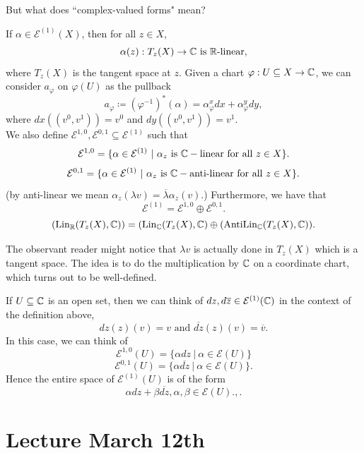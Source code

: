 \documentclass{article}
\begin{document}
{But what does ``complex-valued forms" mean?
\begin{definition}
    If $\alpha \in \mathcal{E}^{(1)}(X)$, then for all $z \in X$,
    \[\alpha(z): T_z(X) \to \mathbb{C} \text{ is $\mathbb{R}$-linear},\]
    where $T_z(X)$ is the tangent space at $z$. Given a chart $\varphi: U \subseteq X \to \mathbb{C}$, we can consider $a_\varphi$ on $\varphi(U)$ as the pullback
    \[a_\varphi \coloneqq (\varphi^{-1})^*(\alpha) = \alpha^x_{\varphi} dx + \alpha^y_{\varphi} dy, \]
    where $dx((v^0, v^1)) = v^0$ and $dy((v^0, v^1)) = v^1$.\\

    We also define $\mathcal{E}^{1, 0}, \mathcal{E}^{0, 1} \subseteq \mathcal{E}^{(1)}$ such that
    \[\mathcal{E}^{1, 0} = \{\alpha \in \mathcal{E}^{(1)}\ |\ \alpha_z \text{ is } \mathbb{C}-\text{linear for all $z \in X$}\}.\]
     \[\mathcal{E}^{0,1} = \{\alpha \in \mathcal{E}^{(1)}\ |\ \alpha_z \text{ is } \mathbb{C}-\text{anti-linear for all $z \in X$}\}.\]
     (by anti-linear we mean $\alpha_z(\lambda v) = \overline{\lambda} \alpha_z(v)$.) Furthermore, we have that
     \[\mathcal{E}^{(1)} = \mathcal{E}^{1, 0} \oplus \mathcal{E}^{0, 1}.\]
     \[(\operatorname{Lin}_{\mathbb{R}}(T_z(X), \mathbb{C})) = (\operatorname{Lin}_{\mathbb{C}}(T_z(X), \mathbb{C}) \oplus (\operatorname{AntiLin}_{\mathbb{C}}(T_z(X), \mathbb{C})).\]

     The observant reader might notice that $\lambda v$ is actually done in $T_z(X)$ which is a tangent space. The idea is to do the multiplication by $\mathbb{C}$ on a coordinate chart, which turns out to be well-defined.\\
\end{definition}

\begin{example}
    If $U \subseteq \mathbb{C}$ is an open set, then we can think of $dz, d\overline{z} \in \mathcal{E}^{(1)}(\mathbb{C})$ in the context of the definition above,
\[dz(z)(v) = v \text{ and } \overline{dz}(z)(v) = \overline{v}. \]
In this case, we can think of
\[\mathcal{E}^{1, 0}(U) = \{\alpha dz \ |\ \alpha \in \mathcal{E}(U)\}\]
\[\mathcal{E}^{0, 1}(U) = \{\alpha \overline{dz}\ |\ \alpha \in \mathcal{E}(U)\}.\]
Hence the entire space of $\mathcal{E}^{(1)}(U)$ is of the form
\[\alpha dz + \beta \overline{dz}, \alpha, \beta \in \mathcal{E}(U).,.\]
\end{example}

\newpage
\section{Lecture March 12th}

}
\end{document}

